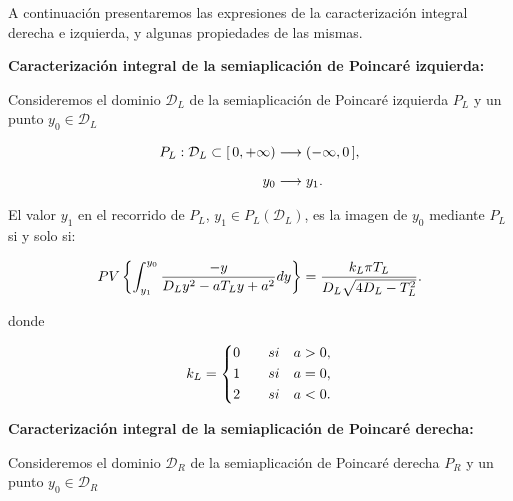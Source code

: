 \documentclass[12pt,a4paper]{report} %
\begin{document}
	\vspace{0.5cm} A continuación presentaremos las expresiones de la caracterización integral derecha e izquierda, y algunas propiedades de las mismas.
	
	\vspace{1cm}\noindent \textbf{Caracterización integral de la semiaplicación de Poincaré izquierda:}
	
	\vspace{0.5cm} Consideremos el dominio $\mathcal{D}_L$ de la semiaplicación de Poincaré izquierda $P_L$ y un punto $y_0 \in \mathcal{D}_L$
	
	\begin{equation}
		\label{eq:dl}
		\scalebox{1}{$\displaystyle
			\begin{aligned}
				P_L:\mathcal{D}_L\subset [\,0,+\infty) &\longrightarrow ( -\infty,0\, ],\\[2mm]
				y_0 &\longrightarrow y_1.
			\end{aligned}
			$}
	\end{equation}\smallskip
	
	\noindent El valor $y_1$ en el recorrido de $P_L$, $y_1 \in P_L(\mathcal{D}_L)$, es la imagen de $y_0$ mediante $P_L$ si y solo si:
	
	\begin{equation}
		\label{eq:caracl}
		\scalebox{1}{$\displaystyle
			PV\left\{\int_{y_1}^{y_0}\frac{-y}{D_Ly^2-aT_Ly+a^2}dy\right\}=\frac{k_L\pi T_L}{D_L\sqrt{4D_L-T_L^2}}.
			$}
	\end{equation}\smallskip
	
	\noindent donde
	
	\begin{equation*}
		k_L=
		\label{eq:kl}
		\scalebox{1}{$\displaystyle
			\left\{
			\begin{aligned}
				0 \qquad si \quad a>0, \\
				1 \qquad si \quad a=0,\\
				2 \qquad si \quad a<0. 
			\end{aligned}
			\right. 
			$}
	\end{equation*}\smallskip
	
	
		\newpage
	
	\vspace{2cm}\noindent \textbf{Caracterización integral de la semiaplicación de Poincaré derecha:}
	
	\vspace{0.5cm} Consideremos el dominio $\mathcal{D}_R$ de la semiaplicación de Poincaré derecha $P_R$ y un punto $y_0 \in \mathcal{D}_R$
	
\end{document}
